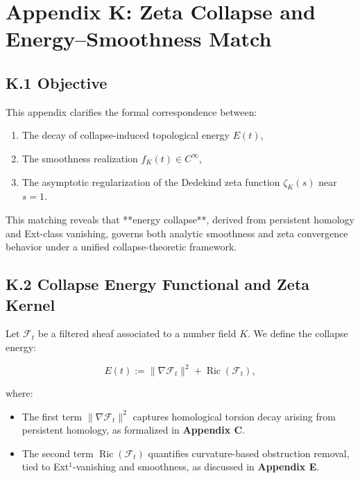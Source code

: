 \documentclass[11pt]{article}
\begin{document}

\section*{Appendix K: Zeta Collapse and Energy–Smoothness Match}

\subsection*{K.1 Objective}

This appendix clarifies the formal correspondence between:

\begin{enumerate}
  \item The decay of collapse-induced topological energy $E(t)$,
  \item The smoothness realization $f_K(t) \in C^\infty$,
  \item The asymptotic regularization of the Dedekind zeta function $\zeta_K(s)$ near $s = 1$.
\end{enumerate}

This matching reveals that **energy collapse**, derived from persistent homology and Ext-class vanishing, governs both analytic smoothness and zeta convergence behavior under a unified collapse-theoretic framework.

\subsection*{K.2 Collapse Energy Functional and Zeta Kernel}

Let $\mathcal{F}_t$ be a filtered sheaf associated to a number field $K$.  
We define the collapse energy:

\[
E(t) := \|\nabla \mathcal{F}_t\|^2 + \operatorname{Ric}(\mathcal{F}_t),
\]

where:
\begin{itemize}
  \item The first term $\|\nabla \mathcal{F}_t\|^2$ captures homological torsion decay arising from persistent homology, as formalized in \textbf{Appendix C}.
  \item The second term $\operatorname{Ric}(\mathcal{F}_t)$ quantifies curvature-based obstruction removal, tied to Ext$^1$-vanishing and smoothness, as discussed in \textbf{Appendix E}.
\end{itemize}
\end{document}
